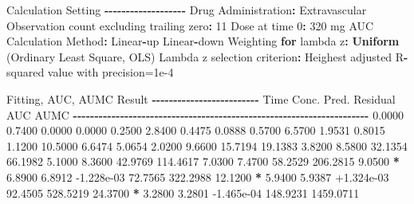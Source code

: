 \documentclass[
  12pt,
]{krantz}
\newenvironment{Shaded}{\begin{snugshade}}{\end{snugshade}}
\newcommand{\ControlFlowTok}[1]{\textcolor[rgb]{0.13,0.29,0.53}{\textbf{#1}}}
\newcommand{\DecValTok}[1]{\textcolor[rgb]{0.00,0.00,0.81}{#1}}
\newcommand{\FloatTok}[1]{\textcolor[rgb]{0.00,0.00,0.81}{#1}}
\newcommand{\KeywordTok}[1]{\textcolor[rgb]{0.13,0.29,0.53}{\textbf{#1}}}
\newcommand{\NormalTok}[1]{#1}
\newcommand{\OperatorTok}[1]{\textcolor[rgb]{0.81,0.36,0.00}{\textbf{#1}}}
\newcommand{\StringTok}[1]{\textcolor[rgb]{0.31,0.60,0.02}{#1}}
\begin{document}
\begin{Shaded}
\begin{Highlighting}[]
\NormalTok{Calculation Setting}
\OperatorTok{{-}{-}{-}{-}{-}{-}{-}{-}{-}{-}{-}{-}{-}{-}{-}{-}{-}{-}{-}}
\NormalTok{Drug Administration}\OperatorTok{:}\StringTok{ }\NormalTok{Extravascular}
\NormalTok{Observation count excluding trailing zero}\OperatorTok{:}\StringTok{ }\DecValTok{11}
\NormalTok{Dose at time }\DecValTok{0}\OperatorTok{:}\StringTok{ }\DecValTok{320}\NormalTok{ mg}
\NormalTok{AUC Calculation Method}\OperatorTok{:}\StringTok{ }\NormalTok{Linear}\OperatorTok{{-}}\NormalTok{up Linear}\OperatorTok{{-}}\NormalTok{down}
\NormalTok{Weighting }\ControlFlowTok{for}\NormalTok{ lambda z}\OperatorTok{:}\StringTok{ }\KeywordTok{Uniform}\NormalTok{ (Ordinary Least Square, OLS)}
\NormalTok{Lambda z selection criterion}\OperatorTok{:}\StringTok{ }\NormalTok{Heighest adjusted R}\OperatorTok{{-}}\NormalTok{squared value with precision=}\FloatTok{1e{-}4}


\NormalTok{Fitting, AUC, AUMC Result}
\OperatorTok{{-}{-}{-}{-}{-}{-}{-}{-}{-}{-}{-}{-}{-}{-}{-}{-}{-}{-}{-}{-}{-}{-}{-}{-}{-}}
\StringTok{      }\NormalTok{Time         Conc.      Pred.   Residual       AUC       AUMC}
\OperatorTok{{-}{-}{-}{-}{-}{-}{-}{-}{-}{-}{-}{-}{-}{-}{-}{-}{-}{-}{-}{-}{-}{-}{-}{-}{-}{-}{-}{-}{-}{-}{-}{-}{-}{-}{-}{-}{-}{-}{-}{-}{-}{-}{-}{-}{-}{-}{-}{-}{-}{-}{-}{-}{-}{-}{-}{-}{-}{-}{-}{-}{-}{-}{-}{-}{-}{-}{-}{-}{-}}
\StringTok{     }\FloatTok{0.0000}       \FloatTok{0.7400}                           \FloatTok{0.0000}     \FloatTok{0.0000}
     \FloatTok{0.2500}       \FloatTok{2.8400}                           \FloatTok{0.4475}     \FloatTok{0.0888}
     \FloatTok{0.5700}       \FloatTok{6.5700}                           \FloatTok{1.9531}     \FloatTok{0.8015}
     \FloatTok{1.1200}      \FloatTok{10.5000}                           \FloatTok{6.6474}     \FloatTok{5.0654}
     \FloatTok{2.0200}       \FloatTok{9.6600}                          \FloatTok{15.7194}    \FloatTok{19.1383}
     \FloatTok{3.8200}       \FloatTok{8.5800}                          \FloatTok{32.1354}    \FloatTok{66.1982}
     \FloatTok{5.1000}       \FloatTok{8.3600}                          \FloatTok{42.9769}   \FloatTok{114.4617}
     \FloatTok{7.0300}       \FloatTok{7.4700}                          \FloatTok{58.2529}   \FloatTok{206.2815}
     \FloatTok{9.0500} \OperatorTok{*}\StringTok{     }\FloatTok{6.8900}     \FloatTok{6.8912} \FloatTok{{-}1.228e{-}03}    \FloatTok{72.7565}   \FloatTok{322.2988}
    \FloatTok{12.1200} \OperatorTok{*}\StringTok{     }\FloatTok{5.9400}     \FloatTok{5.9387} \FloatTok{+1.324e{-}03}    \FloatTok{92.4505}   \FloatTok{528.5219}
    \FloatTok{24.3700} \OperatorTok{*}\StringTok{     }\FloatTok{3.2800}     \FloatTok{3.2801} \FloatTok{{-}1.465e{-}04}   \FloatTok{148.9231}  \FloatTok{1459.0711}


\end{Highlighting}
\end{Shaded}
\end{document}
